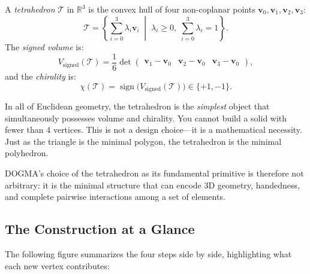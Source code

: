 \begin{definition}[Tetrahedron]
\label{def:tetradata-tetrahedron}
A \emph{tetrahedron} $\mathcal{T}$ in $\mathbb{R}^3$ is the convex hull of four non-coplanar points $\mathbf{v}_0, \mathbf{v}_1, \mathbf{v}_2, \mathbf{v}_3$:
\begin{equation}
\mathcal{T} = \left\{ \sum_{i=0}^{3} \lambda_i \mathbf{v}_i \;\middle|\; \lambda_i \geq 0, \; \sum_{i=0}^{3} \lambda_i = 1 \right\}.
\end{equation}
The \emph{signed volume} is:
\begin{equation}
V_{\text{signed}}(\mathcal{T}) = \frac{1}{6} \det \begin{pmatrix} \mathbf{v}_1 - \mathbf{v}_0 & \mathbf{v}_2 - \mathbf{v}_0 & \mathbf{v}_3 - \mathbf{v}_0 \end{pmatrix},
\label{eq:signed-volume}
\end{equation}
and the \emph{chirality} is:
\begin{equation}
\chi(\mathcal{T}) = \operatorname{sign}\!\big(V_{\text{signed}}(\mathcal{T})\big) \in \{+1, -1\}.
\end{equation}
\end{definition}

\begin{keyinsight}
In all of Euclidean geometry, the tetrahedron is the \emph{simplest} object that
simultaneously possesses volume and chirality. You cannot build a solid with
fewer than 4 vertices. This is not a design choice---it is a mathematical
necessity. Just as the triangle is the minimal polygon, the tetrahedron is
the minimal polyhedron.

DOGMA's choice of the tetrahedron as its fundamental primitive is therefore
not arbitrary: it is the minimal structure that can encode 3D geometry,
handedness, and complete pairwise interactions among a set of elements.
\end{keyinsight}

\subsection{The Construction at a Glance}

The following figure summarizes the four steps side by side, highlighting what
each new vertex contributes:

